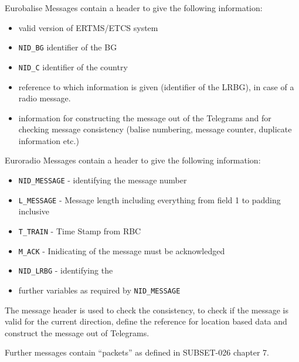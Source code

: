Eurobalise Messages contain a header to give the following information:
\begin{itemize}
\item valid version of ERTMS/ETCS system
\item \verb+NID_BG+ identifier of the BG 
\item \verb+NID_C+ identifier of the country
\item reference to which information is given (identifier of the LRBG), in case of a radio message.
\item information for constructing the message out of the Telegrams and for checking message consistency (balise numbering, message counter, duplicate information etc.)
\end{itemize}

Euroradio Messages contain a header to give the following information:
\begin{itemize}

\item \verb+NID_MESSAGE+ - identifying the message number
\item \verb+L_MESSAGE+ - Message length including everything from field 1 to padding inclusive
\item \verb+T_TRAIN+ - Time Stamp from RBC
\item \verb+M_ACK+ - Inidicating of the message must be acknowledged
\item \verb+NID_LRBG+ - identifying the  
\item further variables as required by \verb+NID_MESSAGE+
\end{itemize}

The message header is used to check the consistency, to check if the message is valid for the current direction, define the reference for location based data and construct the message out of Telegrams.

Further messages contain “packets” as defined in SUBSET-026 chapter 7. 

